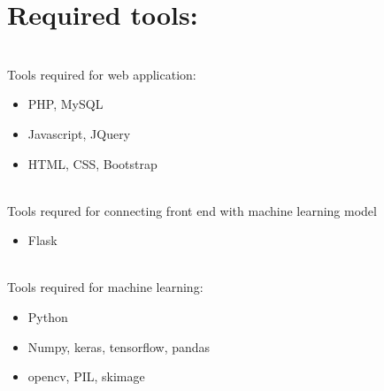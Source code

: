 \documentclass[journal]{IEEEtran}
\begin{document}
\section{Required tools:}
\\
Tools required for web application:
\begin{itemize}
    \item PHP, MySQL
    \item Javascript, JQuery
    \item HTML, CSS, Bootstrap
\end{itemize}
\\
Tools requred for connecting front end with machine learning model
\begin{itemize}
    \item Flask
\end{itemize}
\\
Tools required for machine learning:
\begin{itemize}
    \item Python
    \item Numpy, keras, tensorflow, pandas
    \item opencv, PIL, skimage
\end{itemize}


 
\end{document}
